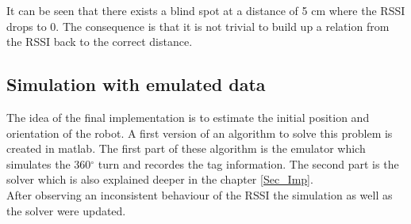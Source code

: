 It can be seen that there exists a blind spot at a distance of 5 cm where the RSSI drops to 0. The consequence is that it is not trivial to build up a relation from the RSSI back to the correct distance. \\

\subsection{Simulation with emulated data}
The idea of the final implementation is to estimate the initial position and orientation of the robot. A first version of an algorithm to solve this problem is created in matlab. The first part of these algorithm is the emulator which simulates the 360$^\circ$ turn and recordes the tag information. The second part is the solver which is also explained deeper in the chapter \ref{Sec_Imp}. \\
After observing an inconsistent behaviour of the RSSI the simulation as well as the solver were updated.\\

